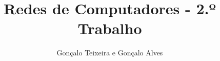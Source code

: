 \documentclass[11pt,a4paper]{report}
\author{Gonçalo Teixeira e Gonçalo Alves}
\title{Redes de Computadores - 2.º Trabalho}
\begin{document}


\cleardoublepage
{}


\tableofcontents 

\cleardoublepage
{}


\cleardoublepage
{}


\cleardoublepage
{}


\cleardoublepage
{}


\cleardoublepage
{}


\cleardoublepage
{}

\end{document}
